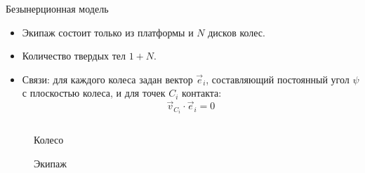 \begin{frame}{Безынерционная модель}
    \begin{itemize}
    \item {
        Экипаж состоит только из платформы и $N$ дисков колес.
    }
    \item {
        Количество твердых тел $1 + N$.
    }
    \item {
        Связи: для каждого колеса задан вектор $\vec{e}_i$, составляющий постоянный угол $\psi$ с плоскостью колеса, и для точек $C_i$ контакта:
        \vspace{-15pt}
        $$\vec{v}_{C_i} \cdot \vec{e}_i = 0$$
    }
    \end{itemize}
    \vspace{-10pt}
    \begin{figure}[H]
        \centering
        \begin{columns}
                \centering
                \caption{Колесо}
                \label{fig:bor_wheel_scheme}
                \centering
                \caption{Экипаж}
                \label{fig:bor_vehicle}
        \end{columns}
    \end{figure}
\end{frame}